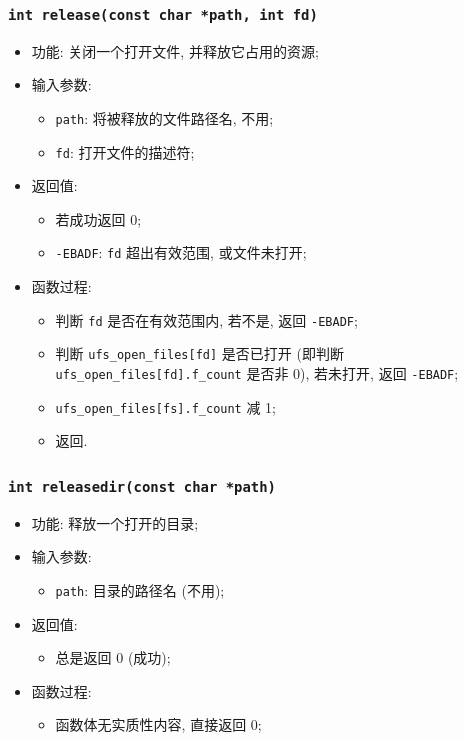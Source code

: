 \documentclass[nofonts]{ctexart}
\begin{document}
  \subsubsection[\texttt{release}]{\texttt{int release(const char *path, int fd)}}
  \begin{itemize}
\item
  功能: 关闭一个打开文件, 并释放它占用的资源;
\item
  输入参数:

  \begin{itemize}
  \item
    \texttt{path}: 将被释放的文件路径名, 不用;
  \item
    \texttt{fd}: 打开文件的描述符;
  \end{itemize}
\item
  返回值:

  \begin{itemize}
  \item
    若成功返回 0;
  \item
    \texttt{-EBADF}: \texttt{fd} 超出有效范围, 或文件未打开;
  \end{itemize}
\item
  函数过程:

  \begin{itemize}
  \item
    判断 \texttt{fd} 是否在有效范围内, 若不是, 返回 \texttt{-EBADF};
  \item
    判断 \texttt{ufs\_open\_files{[}fd{]}} 是否已打开 (即判断
    \texttt{ufs\_open\_files{[}fd{]}.f\_count} 是否非 0), 若未打开, 返回
    \texttt{-EBADF};
  \item
    \texttt{ufs\_open\_files{[}fs{]}.f\_count} 减 1;
  \item
    返回.
  \end{itemize}
  \end{itemize}
  \subsubsection[\texttt{releasedir}]{\texttt{int releasedir(const char *path)}}
  \begin{itemize}
\item
  功能: 释放一个打开的目录;
\item
  输入参数:

  \begin{itemize}
  \item
    \texttt{path}: 目录的路径名 (不用);
  \end{itemize}
\item
  返回值:

  \begin{itemize}
  \item
    总是返回 0 (成功);
  \end{itemize}
\item
  函数过程:

  \begin{itemize}
  \item
    函数体无实质性内容, 直接返回 0;
  \end{itemize}
  \end{itemize}
\end{document}
